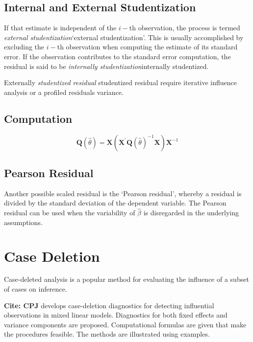 \subsection{Internal and External Studentization} %
If that estimate is independent of the $i-$th observation, the process is termed \emph{external studentization}`external studentization'. This is usually accomplished by excluding the $i-$th observation when computing the estimate of its standard error. If the observation contributes to the
standard error computation, the residual is said to be \emph{internally studentization}internally studentized.

Externally \emph{studentized residual} studentized residual require iterative influence analysis or a profiled residuals variance.

\subsection{Computation}%


\[ \boldsymbol{Q} (\hat{\theta}) = \boldsymbol{X} ( \boldsymbol{X}^{\prime}\boldsymbol{Q} (\hat{\theta})^{-1}\boldsymbol{X})\boldsymbol{X}^{-1} \]

\subsection{Pearson Residual}%

Another possible scaled residual is the  `Pearson residual', whereby a residual is divided by the standard deviation of the dependent variable. The Pearson residual can be used when the variability of $\hat{\beta}$ is disregarded in the underlying assumptions.


\section{Case Deletion} %
Case-deleted analysis is a popular method for evaluating the inﬂuence of a subset of cases on inference.

\textbf{Cite: CPJ} develops case-deletion diagnostics for detecting influential observations in mixed linear models. Diagnostics for both fixed effects and variance components are proposed. Computational formulas are given that make the procedures feasible. The methods are illustrated using examples. 

